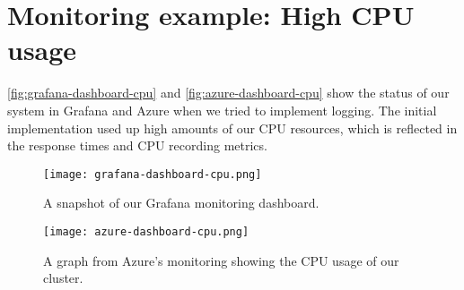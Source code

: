 \section{Monitoring example: High CPU usage}
\label{appendix:monitoring-samples}
\autoref{fig:grafana-dashboard-cpu} and \autoref{fig:azure-dashboard-cpu} show the status of our system in Grafana and Azure when we tried to implement logging. The initial implementation used up high amounts of our CPU resources, which is reflected in the response times and CPU recording metrics.
\begin{figure}[H]
    \begin{center}
        \texttt{[image: grafana-dashboard-cpu.png]}
    \end{center}
    \caption{A snapshot of our Grafana monitoring dashboard.}
    \label{fig:grafana-dashboard-cpu}
\end{figure}
\begin{figure}[H]
    \begin{center}
        \texttt{[image: azure-dashboard-cpu.png]}
    \end{center}
    \caption{A graph from Azure's monitoring showing the CPU usage of our cluster.}
    \label{fig:azure-dashboard-cpu}
\end{figure}
